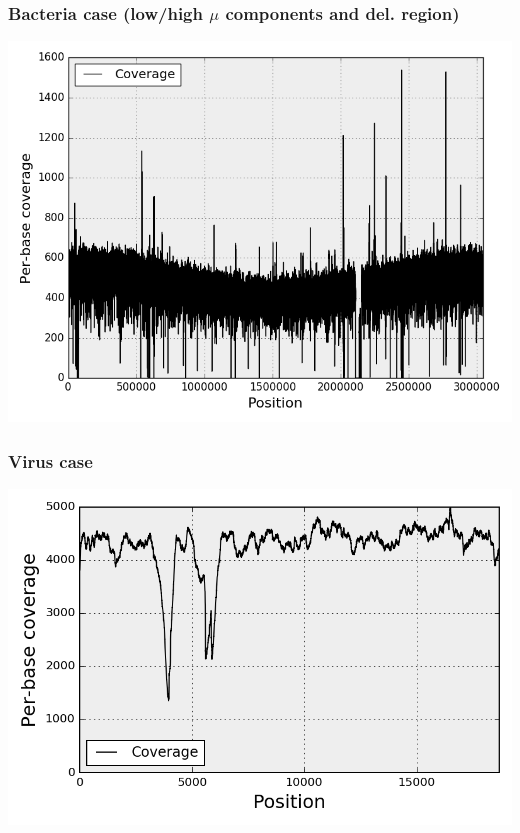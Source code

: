 \documentclass{beamer}
\begin{document}
\begin{frame}
\frametitle{\small Bacteria case (low/high $\mu$ components and del. region)}
\begin{center}
\includegraphics[height=0.9\textheight, 
width=1\textwidth]{images/coverage_bacteria.png}
\end{center}
\end{frame}



\begin{frame}
\frametitle{\small Virus case}
\begin{center}
\includegraphics[height=0.9\textheight, 
width=1\textwidth]{images/coverage_virus.png}
\end{center}
\end{frame}
\end{document}
